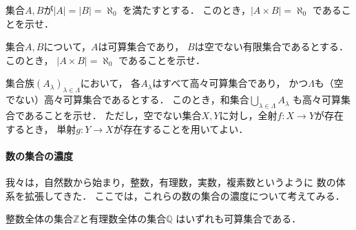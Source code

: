   \begin{que} \label{que:AB2casan}
     集合$A,B$が$\lvert A \rvert = \lvert B \rvert = \aleph _0$
     を満たすとする．
     このとき，$\lvert A \times B \rvert = \aleph _0$
     であることを示せ．
   \end{que}

   \begin{que} \label{que:casan2tyoku}
     集合$A,B$について，$A$は可算集合であり，
     $B$は空でない有限集合であるとする．このとき，
     $\lvert A \times B \rvert = \aleph_0$
     であることを示せ．
   \end{que}

   \begin{que} \label{que:soejikasan}
     集合族$(A_{\lambda}) _{\lambda \in \varLambda}$において，
     各$A_{\lambda}$はすべて高々可算集合であり，
     かつ$\varLambda$も（空でない）高々可算集合であるとする．
     このとき，和集合$\bigcup_{\lambda \in \varLambda} A_{\lambda}$
     も高々可算集合であることを示せ．
     ただし，空でない集合$X,Y$に対し，全射$f: X \longrightarrow Y$が存在するとき，
     単射$g: Y \longrightarrow X$が存在することを用いてよい．
   \end{que}


  \paragraph{数の集合の濃度}
   我々は，自然数から始まり，整数，有理数，実数，複素数というように
   数の体系を拡張してきた．
   ここでは，これらの数の集合の濃度について考えてみる．


   \begin{thm} \label{thm:countablesetsuu}
     整数全体の集合$\mathbb{Z}$と有理数全体の集合$\mathbb{Q}$
     はいずれも可算集合である．
   \end{thm}

